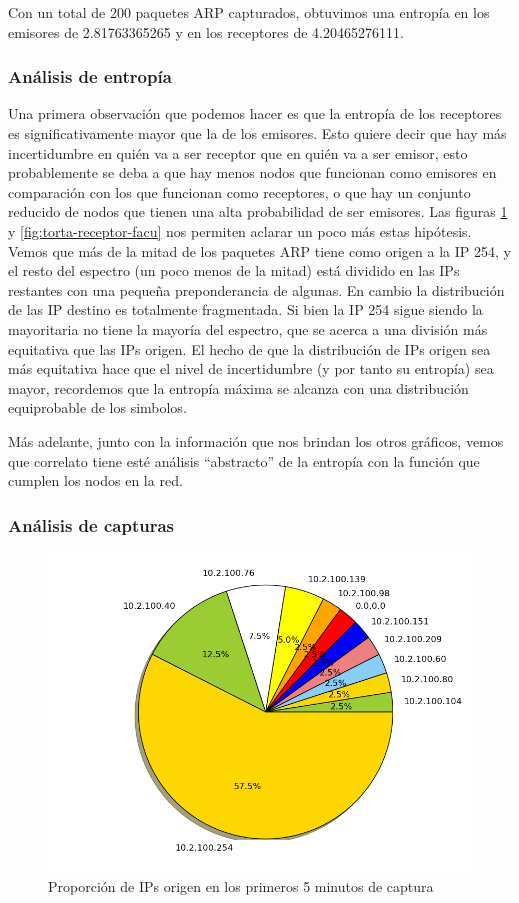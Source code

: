 Con un total de 200 paquetes ARP capturados, obtuvimos una entropía en los
emisores de 2.81763365265 y en los receptores de 4.20465276111.

\subsubsection{Análisis de entropía}
Una primera observación que podemos hacer es que la entropía de los receptores es significativamente mayor que la de los emisores. Esto quiere decir que hay más incertidumbre en quién va a ser receptor que en quién va a ser emisor, esto probablemente se deba a que hay menos nodos que funcionan como emisores en comparación con los que funcionan como receptores, o que hay un conjunto reducido de nodos que tienen una alta probabilidad de ser emisores.
Las figuras \ref{fig:torta-emisor-facu} y \ref{fig:torta-receptor-facu} nos permiten aclarar un poco más estas hipótesis. Vemos que más de la mitad de los paquetes ARP tiene como origen a la IP 254, y el resto del espectro (un poco menos de la mitad) está dividido en las IPs restantes con una pequeña preponderancia de algunas. En cambio la distribución de las IP destino es totalmente fragmentada. Si bien la IP 254 sigue siendo la mayoritaria no tiene la mayoría del espectro, que se acerca a una división más equitativa que las IPs origen. El hecho de que la distribución de IPs origen sea más equitativa hace que el nivel de incertidumbre (y por tanto su entropía) sea mayor, recordemos que la entropía máxima se alcanza con una distribución equiprobable de los simbolos.

Más adelante, junto con la información que nos brindan los otros gráficos, vemos que correlato tiene esté análisis ``abstracto'' de la entropía con la función que cumplen los nodos en la red.

\subsubsection{Análisis de capturas}
\begin{figure}[!h]
  \includegraphics[width=\textwidth,keepaspectratio]{graph/emisores_facu.png}
  \caption{Proporción de IPs origen en los primeros 5 minutos de captura}
  \label{fig:torta-emisor-facu}
\end{figure}

